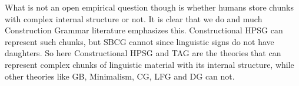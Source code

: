 What is not an open empirical question though is whether humans store chunks with complex internal
structure or not. It is clear that we do and much Construction Grammar literature emphasizes
this. Constructional HPSG can represent such chunks, but SBCG cannot since linguistic signs do not
have daughters. So here Constructional HPSG and TAG are the theories that can represent complex
chunks of linguistic material with its internal structure, while other theories like GB,
Minimalism, CG, LFG and DG can not.





  
